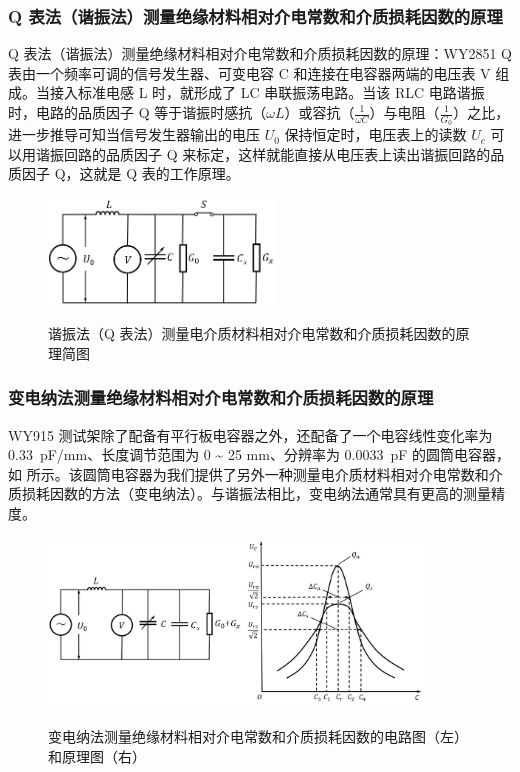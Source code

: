 \documentclass[a4paper,utf8]{article}
\begin{document}
        \subsubsection{Q 表法（谐振法）测量绝缘材料相对介电常数和介质损耗因数的原理}
            Q 表法（谐振法）测量绝缘材料相对介电常数和介质损耗因数的原理：WY2851 Q 表由一个频率可调的信号发生器、可变电容 C 和连接在电容器两端的电压表 V 组成。当接入标准电感 L 时，就形成了 LC 串联振荡电路。当该 RLC 电路谐振时，电路的品质因子 Q 等于谐振时感抗（$\omega L$）或容抗（$\frac{1}{\omega C}$）与电阻（$\frac{1}{G_0}$）之比，进一步推导可知当信号发生器输出的电压 $U_0$ 保持恒定时，电压表上的读数 $U_c$ 可以用谐振回路的品质因子 Q 来标定，这样就能直接从电压表上读出谐振回路的品质因子 Q，这就是 Q 表的工作原理。\par
            \begin{figure}[!ht]\centering
                \includegraphics[width=60mm]{fg4.jpg}\
                \caption{谐振法（Q 表法）测量电介质材料相对介电常数和介质损耗因数的原理简图\label{fig:4}}
            \end{figure}\par
        \subsubsection{变电纳法测量绝缘材料相对介电常数和介质损耗因数的原理}
            WY915 测试架除了配备有平行板电容器之外，还配备了一个电容线性变化率为 \SI{0.33}{\pico\farad/\milli\metre}、长度调节范围为 0 \~{} 25 \unit{\milli\metre}、分辨率为 \SI{0.0033}{\pico\farad} 的圆筒电容器，如  所示。该圆筒电容器为我们提供了另外一种测量电介质材料相对介电常数和介质损耗因数的方法（变电纳法）。与谐振法相比，变电纳法通常具有更高的测量精度。

        \begin{figure}[!ht]\centering
            \includegraphics[width=100mm]{fg5.jpg}\
            \caption{变电纳法测量绝缘材料相对介电常数和介质损耗因数的电路图（左）和原理图（右）\label{fig:5}}
        \end{figure}
\end{document}
